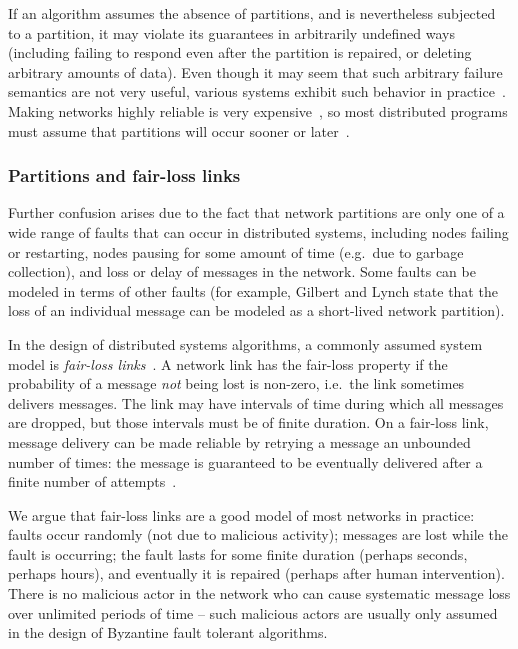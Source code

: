\documentclass[a4paper,twocolumn,10pt]{article}
\begin{document}
If an algorithm assumes the absence of partitions, and is nevertheless subjected to a partition, it
may violate its guarantees in arbitrarily undefined ways (including failing to respond even after
the partition is repaired, or deleting arbitrary amounts of data). Even though it may seem that such
arbitrary failure semantics are not very useful, various systems exhibit such behavior in
practice~\cite{Kingsbury2014tk, Kingsbury2015uk}. Making networks highly reliable is very
expensive~\cite{Bailis2014jx}, so most distributed programs must assume that partitions will occur
sooner or later~\cite{Hale2010we}.

\subsubsection{Partitions and fair-loss links}\label{sec:fairloss}

Further confusion arises due to the fact that network partitions are only one of a wide range of
faults that can occur in distributed systems, including nodes failing or restarting, nodes pausing
for some amount of time (e.g.\ due to garbage collection), and loss or delay of messages in the
network. Some faults can be modeled in terms of other faults (for example, Gilbert and Lynch state
that the loss of an individual message can be modeled as a short-lived network partition).

In the design of distributed systems algorithms, a commonly assumed system model is \emph{fair-loss
links}~\cite{Cachin2011wt}. A network link has the fair-loss property if the probability of a
message \emph{not} being lost is non-zero, i.e.\ the link sometimes delivers messages. The link may
have intervals of time during which all messages are dropped, but those intervals must be of finite
duration. On a fair-loss link, message delivery can be made reliable by retrying a message an
unbounded number of times: the message is guaranteed to be eventually delivered after a finite
number of attempts~\cite{Cachin2011wt}.

We argue that fair-loss links are a good model of most networks in practice: faults occur randomly
(not due to malicious activity); messages are lost while the fault is occurring; the fault lasts for
some finite duration (perhaps seconds, perhaps hours), and eventually it is repaired (perhaps after
human intervention). There is no malicious actor in the network who can cause systematic message
loss over unlimited periods of time -- such malicious actors are usually only assumed in the design
of Byzantine fault tolerant algorithms.
\end{document}
